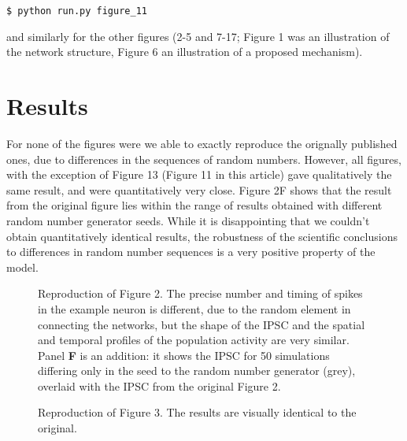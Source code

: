 \begin{verbatim}
$ python run.py figure_11
\end{verbatim}

and similarly for the other figures (2-5 and 7-17; Figure 1 was an illustration of the network structure, Figure 6 an illustration of a proposed mechanism).


\section{Results}


For none of the figures were we able to exactly reproduce the orignally published ones, due to differences in the sequences of random numbers.
However, all figures, with the exception of Figure 13 (Figure 11 in this article) gave qualitatively the same result, and were quantitatively very close.
Figure 2F shows that the result from the original figure lies within the range of results obtained with different random number generator seeds.
While it is disappointing that we couldn't obtain quantitatively identical results,
the robustness of the scientific conclusions to differences in random number sequences is a very positive property of the model.

\begin{figure}
    \begin{minipage}{0.48\textwidth}
        \caption{Reproduction of Figure 2. The precise number and timing of spikes in the example neuron is different,
                 due to the random element in connecting the networks,
                 but the shape of the IPSC and the spatial and temporal profiles of the population activity are very similar.
                 Panel \textbf{F} is an addition: it shows the IPSC for 50 simulations differing only in the seed to the
                 random number generator (grey), overlaid with the IPSC from the original Figure 2.}
    \end{minipage}\hfill
    \begin{minipage}{0.48\textwidth}
        \caption{Reproduction of Figure 3. The results are visually identical to the original.}
    \end{minipage}
\end{figure}

